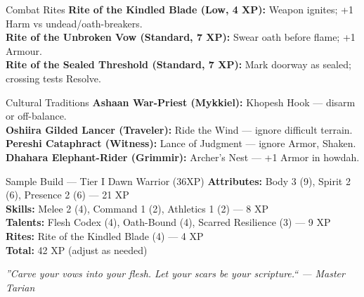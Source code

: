 \documentclass[10pt]{article}
\begin{document}
\begin{minipage}[t]{0.48\linewidth}
    \begin{charbox}{Combat Rites}
        \textbf{Rite of the Kindled Blade (Low, 4 XP):} Weapon ignites; +1 Harm vs undead/oath-breakers.\\
        \textbf{Rite of the Unbroken Vow (Standard, 7 XP):} Swear oath before flame; +1 Armour.\\
        \textbf{Rite of the Sealed Threshold (Standard, 7 XP):} Mark doorway as sealed; crossing tests Resolve.
    \end{charbox}
    
    \vspace{0.5em}
    
    \begin{charbox}{Cultural Traditions}
        \textbf{Ashaan War-Priest (Mykkiel):} Khopesh Hook --- disarm or off-balance.\\
        \textbf{Oshiira Gilded Lancer (Traveler):} Ride the Wind --- ignore difficult terrain.\\
        \textbf{Pereshi Cataphract (Witness):} Lance of Judgment --- ignore Armor, Shaken.\\
        \textbf{Dhahara Elephant-Rider (Grimmir):} Archer's Nest --- +1 Armor in howdah.
    \end{charbox}
    
    \vspace{0.5em}
    
    \begin{charbox}{Sample Build --- Tier I Dawn Warrior (36XP)}
        \textbf{Attributes:} Body 3 (9), Spirit 2 (6), Presence 2 (6) --- 21 XP\\
        \textbf{Skills:} Melee 2 (4), Command 1 (2), Athletics 1 (2) --- 8 XP\\
        \textbf{Talents:} Flesh Codex (4), Oath-Bound (4), Scarred Resilience (3) --- 9 XP\\
        \textbf{Rites:} Rite of the Kindled Blade (4) --- 4 XP\\
        \textbf{Total:} 42 XP (adjust as needed)
    \end{charbox}
\end{minipage}

\vspace{0.5em}
\begin{center}
    {\small\sffamily\itshape ''Carve your vows into your flesh. Let your scars be your scripture.`` --- Master Tarian}
\end{center}
\end{document}
